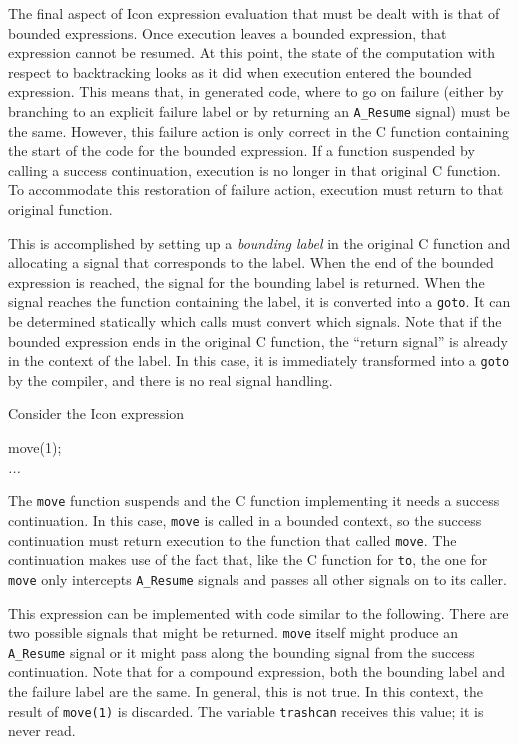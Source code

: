 The final aspect of Icon expression evaluation that must be dealt with
is that of bounded expressions. Once execution leaves a bounded
expression, that expression cannot be resumed. At this point, the
state of the computation with respect to backtracking looks as it did
when execution entered the bounded expression. This means that, in
generated code, where to go on failure (either by branching to an
explicit failure label or by returning an \texttt{A\_Resume} signal)
must be the same. However, this failure action is only correct in the
C function containing the start of the code for the bounded
expression. If a function suspended by calling a success continuation,
execution is no longer in that original C function. To accommodate
this restoration of failure action, execution must return to that
original function.

This is accomplished by setting up a \textit{bounding label} in the
original C function and allocating a signal that corresponds to the
label. When the end of the bounded expression is reached, the signal
for the bounding label is returned. When the signal reaches the
function containing the label, it is converted into
a \texttt{goto}. It can be determined statically which calls must
convert which signals. Note that if the bounded expression ends in the
original C function, the ``return signal'' is already in the context
of the label. In this case, it is immediately transformed into
a \texttt{goto} by the compiler, and there is no real signal handling.


Consider the Icon expression 

\goodbreak
\begin{iconcode}
move(1);\\
\>\textit{...}\\
\end{iconcode}

\noindent
The \texttt{move} function suspends and the C function implementing it
needs a success continuation. In this case, \texttt{move} is called in
a bounded context, so the success continuation must return execution
to the function that called \texttt{move}. The continuation makes use
of the fact that, like the C function for \texttt{to}, the one
for \texttt{move} only intercepts \texttt{A\_Resume} signals and
passes all other signals on to its caller.

This expression can be implemented with code similar to the
following. There are two possible signals that might be returned.
\texttt{move} itself might produce an \texttt{A\_Resume} signal or it
might pass along the bounding signal from the success continuation.
Note that for a compound expression, both the bounding label and the
failure label are the same. In general, this is not true. In this
context, the result of \texttt{move(1)} is discarded. The variable
\texttt{trashcan} receives this value; it is never read.

